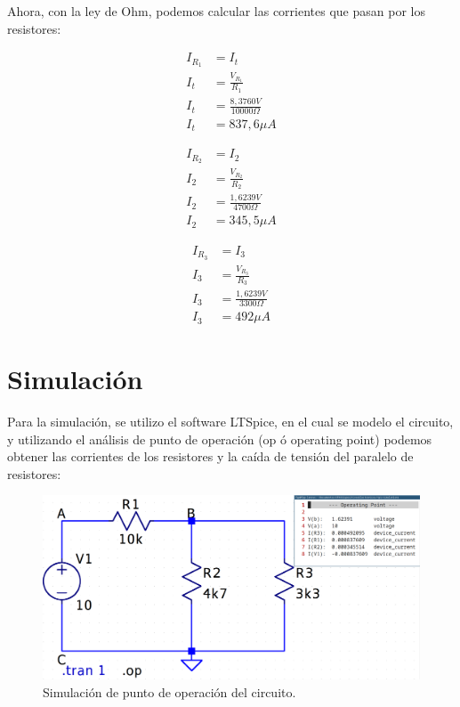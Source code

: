 \documentclass[a4paper,12pt, spanish]{report}
\begin{document}
      Ahora, con la ley de Ohm, podemos calcular las corrientes que pasan por los resistores:
      \begin{figure}[!h]
      \centering
      \begin{minipage}{0.3\textwidth}
        \begin{align*}
          I_{R_1} &= I_t\\
          I_t &= \frac{V_{R_1}}{R_1}\\
          I_t &= \frac{8,3760V}{10000\Omega}\\
          I_t &= 837,6\mu A
        \end{align*}
      \end{minipage}
      \centering
      \begin{minipage}{0.3\textwidth}
        \begin{align*}
          I_{R_2} &= I_2\\
          I_2 &= \frac{V_{R_2}}{R_2}\\
          I_2 &= \frac{1,6239V}{4700\Omega}\\
          I_2 &= 345,5\mu A
        \end{align*}
      \end{minipage}
      \centering
      \begin{minipage}{0.3\textwidth}
        \begin{align*}
          I_{R_3} &= I_3\\
          I_3 &= \frac{V_{R_3}}{R_3}\\
          I_3 &= \frac{1,6239V}{3300\Omega}\\
          I_3 &= 492\mu A
        \end{align*}
      \end{minipage}
      \end{figure}
      
      \section{Simulación}
      Para la simulación, se utilizo el software LTSpice, en el cual se modelo el circuito, y utilizando el análisis de
      punto de operación (op ó operating point) podemos obtener las corrientes de los resistores y la caída de
      tensión del paralelo de resistores:
      \begin{figure}[!h]
        \centering
        \includegraphics[width=0.8\linewidth]{images/sim_dc.png}

        \caption{Simulación de punto de operación del circuito.}
      \end{figure}
\end{document}
